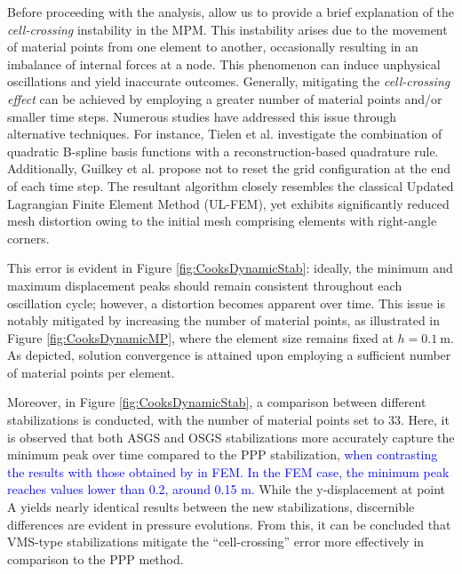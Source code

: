 \documentclass[11pt,english]{article}
\newcommand{\LM}[1]{\textcolor{blue}{#1}}
\begin{document}
        Before proceeding with the analysis, allow us to provide a brief explanation of the \textit{cell-crossing} instability \cite{Vaucorbeil2020material25} in the MPM. This instability arises due to the movement of material points from one element to another, occasionally resulting in an imbalance of internal forces at a node. This phenomenon can induce unphysical oscillations and yield inaccurate outcomes. Generally, mitigating the \textit{cell-crossing effect} can be achieved by employing a greater number of material points and/or smaller time steps. Numerous studies have addressed this issue through alternative techniques. For instance, Tielen et al. \cite{tielen2017high} investigate the combination of quadratic B-spline basis functions with a reconstruction-based quadrature rule. Additionally, Guilkey et al. \cite{guilkey2006computational} propose not to reset the grid configuration at the end of each time step. The resultant algorithm closely resembles the classical Updated Lagrangian Finite Element Method (UL-FEM), yet exhibits significantly reduced mesh distortion owing to the initial mesh comprising elements with right-angle corners.
        
	This error is evident in Figure \ref{fig:CooksDynamicStab}: ideally, the minimum and maximum displacement peaks should remain consistent throughout each oscillation cycle; however, a distortion becomes apparent over time. This issue is notably mitigated by increasing the number of material points, as illustrated in Figure \ref{fig:CooksDynamicMP}, where the element size remains fixed at $h=0.1\ \text{m}$. As depicted, solution convergence is attained upon employing a sufficient number of material points per element.
        
	Moreover, in Figure \ref{fig:CooksDynamicStab}, a comparison between different stabilizations is conducted, with the number of material points set to 33. Here, it is observed that both ASGS and OSGS stabilizations more accurately capture the minimum peak over time compared to the PPP stabilization, \LM{when contrasting the results with those obtained by \cite{castanar2020stabilized} in FEM. In the FEM case, the minimum peak reaches values lower than 0.2, around 0.15 m.} While the y-displacement at point A yields nearly identical results between the new stabilizations, discernible differences are evident in pressure evolutions. From this, it can be concluded that VMS-type stabilizations mitigate the ``cell-crossing'' error more effectively in comparison to the PPP method.
	
\end{document}
